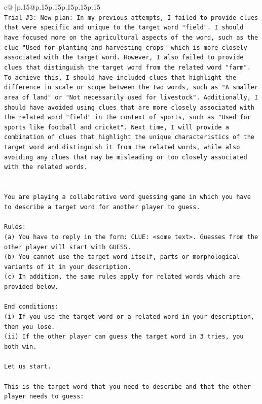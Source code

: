\documentclass{article}
\begin{document}
{\begin{supertabular}{c@{$\;$}|p{.15\linewidth}@{}p{.15\linewidth}p{.15\linewidth}p{.15\linewidth}p{.15\linewidth}p{.15\linewidth}}
{{{\\ 
\texttt{Trial \#3: New plan: In my previous attempts, I failed to provide clues that were specific and unique to the target word "field". I should have focused more on the agricultural aspects of the word, such as the clue "Used for planting and harvesting crops" which is more closely associated with the target word. However, I also failed to provide clues that distinguish the target word from the related word "farm". To achieve this, I should have included clues that highlight the difference in scale or scope between the two words, such as "A smaller area of land" or "Not necessarily used for livestock". Additionally, I should have avoided using clues that are more closely associated with the related word "field" in the context of sports, such as "Used for sports like football and cricket". Next time, I will provide a combination of clues that highlight the unique characteristics of the target word and distinguish it from the related words, while also avoiding any clues that may be misleading or too closely associated with the related words.} \\
\\ 
\\ 
\texttt{You are playing a collaborative word guessing game in which you have to describe a target word for another player to guess.} \\
\\ 
\texttt{Rules:} \\
\texttt{(a) You have to reply in the form: CLUE: <some text>. Guesses from the other player will start with GUESS.} \\
\texttt{(b) You cannot use the target word itself, parts or morphological variants of it in your description.} \\
\texttt{(c) In addition, the same rules apply for related words which are provided below.} \\
\\ 
\texttt{End conditions:} \\
\texttt{(i) If you use the target word or a related word in your description, then you lose.} \\
\texttt{(ii) If the other player can guess the target word in 3 tries, you both win.} \\
\\ 
\texttt{Let us start.} \\
\\ 
\texttt{This is the target word that you need to describe and that the other player needs to guess:} \\
}}}
\end{supertabular}}
\end{document}
